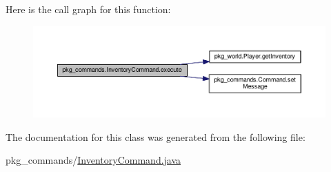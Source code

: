 Here is the call graph for this function\-:\nopagebreak
\begin{figure}[H]
\begin{center}
\leavevmode
\includegraphics[width=350pt]{classpkg__commands_1_1InventoryCommand_a16ce9e3db461ecb7c4a50d2bdef65022_cgraph}
\end{center}
\end{figure}




The documentation for this class was generated from the following file\-:\begin{DoxyCompactItemize}
\item 
pkg\-\_\-commands/\hyperlink{InventoryCommand_8java}{Inventory\-Command.\-java}\end{DoxyCompactItemize}
